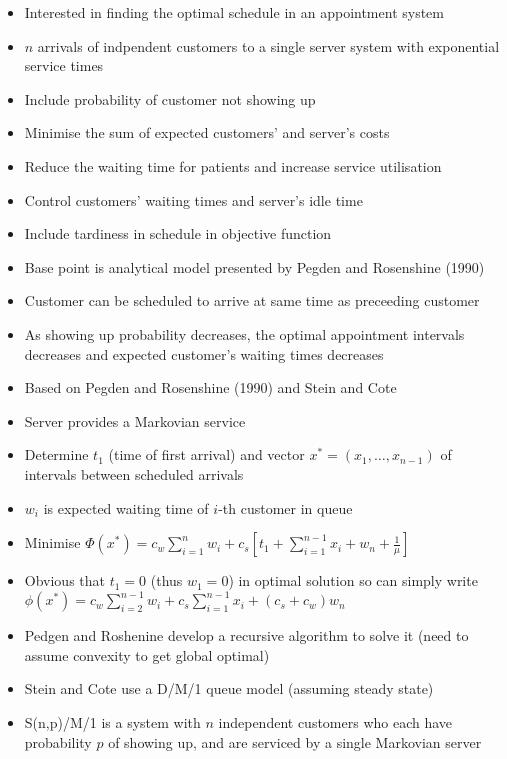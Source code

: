 \documentclass{article}
\begin{document}
\begin{itemize}
	\item Interested in finding the optimal schedule in an appointment system
    \item $n$ arrivals of indpendent customers to a single server system with exponential service times
    \item Include probability of customer not showing up
    \item Minimise the sum of expected customers' and server's costs
    \item Reduce the waiting time for patients and increase service utilisation
    \item Control customers' waiting times and server's idle time
    \item Include tardiness in schedule in objective function
    \item Base point is analytical model presented by Pegden and Rosenshine (1990)
    \item Customer can be scheduled to arrive at same time as preceeding customer
    \item As showing up probability decreases, the optimal appointment intervals decreases and expected customer's waiting times decreases
    \item Based on Pegden and Rosenshine (1990) and Stein and Cote
    \item Server provides a Markovian service
    \item Determine $t_{1}$ (time of first arrival) and vector $x^{*} = (x_{1}, \ldots, x_{n - 1})$ of intervals between scheduled arrivals
    \item $w_{i}$ is expected waiting time of $i$-th customer in queue
    \item Minimise $\Phi (x^{*}) = c_{w} \sum_{i = 1}^{n} w_{i} + c_{s} \left[ t_{1} + \sum_{i = 1}^{n - 1} x_{i} + w_{n} + \frac{1}{\mu} \right]$
    \item Obvious that $t_{1} = 0$ (thus $w_{1} = 0$) in optimal solution so can simply write $\phi (x^{*}) = c_{w} \sum_{i = 2}^{n - 1} w_{i} + c_{s} \sum_{i = 1}^{n - 1} x_{i} + (c_{s} + c_{w}) w_{n}$
    \item Pedgen and Roshenine develop a recursive algorithm to solve it (need to assume convexity to get global optimal)
    \item Stein and Cote use a D/M/1 queue model (assuming steady state)
    \item S(n,p)/M/1 is a system with $n$ independent customers who each have probability $p$ of showing up, and are serviced by a single Markovian server

\end{itemize}
\end{document}
